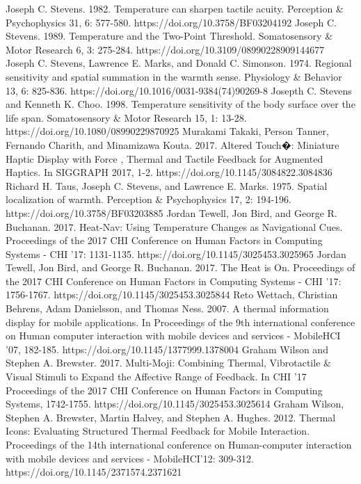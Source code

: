 \documentclass[preprint,12pt]{elsarticle}
\begin{document}
\begin{thebibliography}{00}
Joseph C. Stevens. 1982. Temperature can sharpen tactile acuity. Perception \& Psychophysics 31, 6: 577-580. https://doi.org/10.3758/BF03204192
Joseph C. Stevens. 1989. Temperature and the Two-Point Threshold. Somatosensory \& Motor Research 6, 3: 275-284. https://doi.org/10.3109/08990228909144677
Joseph C. Stevens, Lawrence E. Marks, and Donald C. Simonson. 1974. Regional sensitivity and spatial summation in the warmth sense. Physiology \& Behavior 13, 6: 825-836. https://doi.org/10.1016/0031-9384(74)90269-8
Josepth C. Stevens and Kenneth K. Choo. 1998. Temperature sensitivity of the body surface over the life span. Somatosensory \& Motor Research 15, 1: 13-28. https://doi.org/10.1080/08990229870925
Murakami Takaki, Person Tanner, Fernando Charith, and Minamizawa Kouta. 2017. Altered Touch�: Miniature Haptic Display with Force , Thermal and Tactile Feedback for Augmented Haptics. In SIGGRAPH 2017, 1-2. https://doi.org/10.1145/3084822.3084836
Richard H. Taus, Joseph C. Stevens, and Lawrence E. Marks. 1975. Spatial localization of warmth. Perception \& Psychophysics 17, 2: 194-196. https://doi.org/10.3758/BF03203885
Jordan Tewell, Jon Bird, and George R. Buchanan. 2017. Heat-Nav: Using Temperature Changes as Navigational Cues. Proceedings of the 2017 CHI Conference on Human Factors in Computing Systems - CHI '17: 1131-1135. https://doi.org/10.1145/3025453.3025965
Jordan Tewell, Jon Bird, and George R. Buchanan. 2017. The Heat is On. Proceedings of the 2017 CHI Conference on Human Factors in Computing Systems - CHI '17: 1756-1767. https://doi.org/10.1145/3025453.3025844
Reto Wettach, Christian Behrens, Adam Danielsson, and Thomas Ness. 2007. A thermal information display for mobile applications. In Proceedings of the 9th international conference on Human computer interaction with mobile devices and services - MobileHCI '07, 182-185. https://doi.org/10.1145/1377999.1378004
Graham Wilson and Stephen A. Brewster. 2017. Multi-Moji: Combining Thermal, Vibrotactile \& Visual Stimuli to Expand the Affective Range of Feedback. In CHI '17 Proceedings of the 2017 CHI Conference on Human Factors in Computing Systems, 1742-1755. https://doi.org/10.1145/3025453.3025614
Graham Wilson, Stephen A. Brewster, Martin Halvey, and Stephen A. Hughes. 2012. Thermal Icons: Evaluating Structured Thermal Feedback for Mobile Interaction. Proceedings of the 14th international conference on Human-computer interaction with mobile devices and services - MobileHCI'12: 309-312. https://doi.org/10.1145/2371574.2371621

\end{thebibliography}
\end{document}

